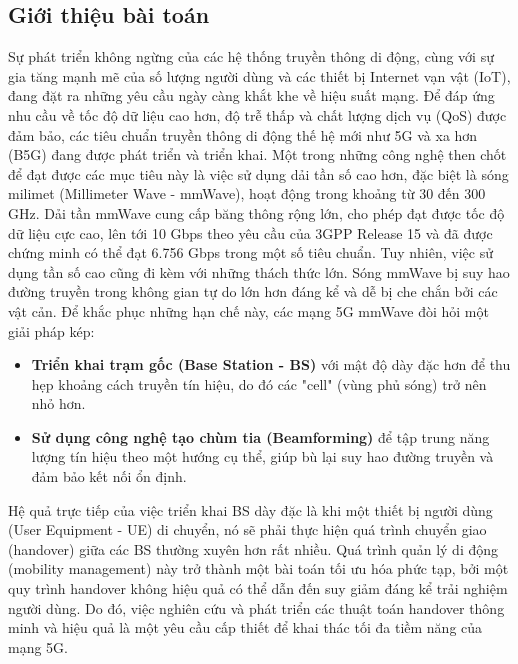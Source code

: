 \documentclass{article} %
\begin{document}
\subsection{Giới thiệu bài toán}
Sự phát triển không ngừng của các hệ thống truyền thông di động, cùng với sự gia tăng mạnh mẽ của số lượng người dùng và các thiết bị Internet vạn vật (IoT), đang đặt ra những yêu cầu ngày càng khắt khe về hiệu suất mạng. Để đáp ứng nhu cầu về tốc độ dữ liệu cao hơn, độ trễ thấp và chất lượng dịch vụ (QoS) được đảm bảo, các tiêu chuẩn truyền thông di động thế hệ mới như 5G và xa hơn (B5G) đang được phát triển và triển khai.
Một trong những công nghệ then chốt để đạt được các mục tiêu này là việc sử dụng dải tần số cao hơn, đặc biệt là sóng milimet (Millimeter Wave - mmWave), hoạt động trong khoảng từ 30 đến 300 GHz. Dải tần mmWave cung cấp băng thông rộng lớn, cho phép đạt được tốc độ dữ liệu cực cao, lên tới 10 Gbps theo yêu cầu của 3GPP Release 15 và đã được chứng minh có thể đạt 6.756 Gbps trong một số tiêu chuẩn. Tuy nhiên, việc sử dụng tần số cao cũng đi kèm với những thách thức lớn. Sóng mmWave bị suy hao đường truyền trong không gian tự do lớn hơn đáng kể và dễ bị che chắn bởi các vật cản.
Để khắc phục những hạn chế này, các mạng 5G mmWave đòi hỏi một giải pháp kép:
\begin{itemize}
    \item \textbf{Triển khai trạm gốc (Base Station - BS)} với mật độ dày đặc hơn để thu hẹp khoảng cách truyền tín hiệu, do đó các "cell" (vùng phủ sóng) trở nên nhỏ hơn.
    \item \textbf{Sử dụng công nghệ tạo chùm tia (Beamforming)} để tập trung năng lượng tín hiệu theo một hướng cụ thể, giúp bù lại suy hao đường truyền và đảm bảo kết nối ổn định.
\end{itemize}
Hệ quả trực tiếp của việc triển khai BS dày đặc là khi một thiết bị người dùng (User Equipment - UE) di chuyển, nó sẽ phải thực hiện quá trình chuyển giao (handover) giữa các BS thường xuyên hơn rất nhiều. Quá trình quản lý di động (mobility management) này trở thành một bài toán tối ưu hóa phức tạp, bởi một quy trình handover không hiệu quả có thể dẫn đến suy giảm đáng kể trải nghiệm người dùng. Do đó, việc nghiên cứu và phát triển các thuật toán handover thông minh và hiệu quả là một yêu cầu cấp thiết để khai thác tối đa tiềm năng của mạng 5G.
\end{document}
